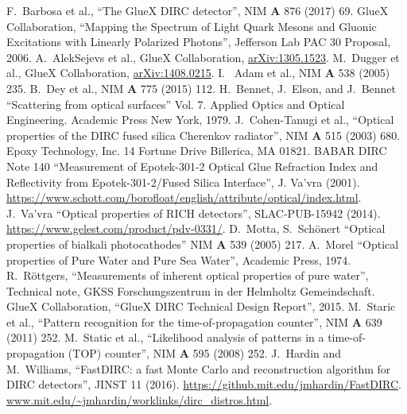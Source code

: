 \documentclass[11pt, a4paper]{article}
\begin{document}
\begin{thebibliography}{1}
 F.~Barbosa et al., ``The GlueX DIRC detector'', NIM \textbf{A} 876 (2017) 69.
 GlueX Collaboration, ``Mapping the Spectrum of Light Quark Mesons and Gluonic Excitations with Linearly Polarized Photons'', Jefferson Lab PAC 30 Proposal, 2006.
 A.~AlekSejevs et al., GlueX Collaboration, \url{arXiv:1305.1523}.
 M.~Dugger et al., GlueX Collaboration, \url{arXiv:1408.0215}. 
 I.~ Adam et al., NIM \textbf{A} 538 (2005) 235.
 B.~Dey et al., NIM \textbf{A} 775 (2015) 112.
 H.~Bennet, J.~Elson, and J.~Bennet ``Scattering from optical surfaces'' Vol. 7. Applied Optics and Optical Engineering. Academic Press New York, 1979.
 J.~Cohen-Tanugi et al., ``Optical properties of the DIRC fused silica Cherenkov radiator'', NIM \textbf{A} 515 (2003) 680. 
 Epoxy Technology, Inc. 14 Fortune Drive Billerica, MA 01821.
 BABAR DIRC Note 140 ``Measurement of Epotek-301-2 Optical Glue Refraction Index and Reflectivity from Epotek-301-2/Fused Silica Interface'', J. Va'vra (2001).
\url{https://www.schott.com/borofloat/english/attribute/optical/index.html}.
 J.~Va'vra ``Optical properties of RICH detectors'', SLAC-PUB-15942 (2014).
\url{https://www.gelest.com/product/pdv-0331/}.
 D.~Motta, S.~Sch{\"o}nert ``Optical properties of bialkali photocathodes'' NIM \textbf{A} 539 (2005) 217. 
 A.~Morel ``Optical properties of Pure Water and Pure Sea Water'', Academic Press, 1974.
 R.~R{\"o}ttgers, ``Measurements of inherent optical properties of pure water'', Technical note, GKSS Forschungszentrum in der Helmholtz Gemeindschaft.
 GlueX Collaboration, ``GlueX DIRC Technical Design Report'', 2015.
 M.~Staric et al., ``Pattern recognition for the time-of-propagation counter'', NIM \textbf{A} 639 (2011) 252.
 M.~Static et al., ``Likelihood analysis of patterns in a time-of-propagation (TOP) counter'', NIM \textbf{A} 595 (2008) 252.
 J.~Hardin and M.~Williams, ``FastDIRC: a fast Monte Carlo and reconstruction algorithm for DIRC detectors'', JINST 11 (2016).
\url{https://github.mit.edu/jmhardin/FastDIRC}.
\url{www.mit.edu/~jmhardin/worklinks/dirc\_distros.html}.

\end{thebibliography}
\end{document}

